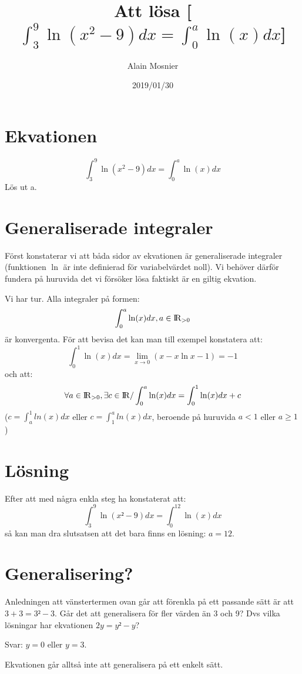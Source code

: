 \documentclass[12pt]{article}
\title{Att lösa [$\int_{3}^{9}\ln({x^2 -9})dx = \int_{0}^{a}\ln({x})dx$]}
\author{Alain Mosnier}
\date{2019/01/30}
\begin{document}
\maketitle

\section {Ekvationen}
\begin{equation}
\int_{3}^{9}\ln({x^2 -9})dx = \int_{0}^{a}\ln({x})dx
\end{equation}
Lös ut a.
\section {Generaliserade integraler}
\item Först konstaterar vi att båda sidor av ekvationen är generaliserade integraler (funktionen $\ln$ är inte definierad för variabelvärdet noll). Vi behöver därför fundera på huruvida det vi försöker lösa faktiskt är en giltig ekvation.
\item Vi har tur. Alla integraler på formen:
\begin{equation}
\int_{0}^{a}\ln({x})dx, a \in {\rm I\!R}_{>0}
\end{equation}
är konvergenta.
För att bevisa det kan man till exempel konstatera att:
\begin{equation}
\int_{0}^{1}\ln({x})dx=\lim_{x \to 0}(x-x\ln x-1)=-1
\end{equation}
och att:
\begin{equation}
\forall a \in {\rm I\!R}_{>0}, \exists c \in {\rm I\!R} / \int_{0}^{a}\ln({x})dx=\int_{0}^{1}\ln({x})dx+c
\end{equation}
($c=\int_{a}^{1}ln({x})dx$ eller $c=\int_{1}^{a}ln({x})dx$, beroende på huruvida $a<1$ eller $a\geq1$)
\section {Lösning}
Efter att med några enkla steg ha konstaterat att:
\begin{equation}
\int_{3}^{9}\ln({x²-9})dx=\int_{0}^{12}\ln({x})dx
\end{equation}
så kan man dra slutsatsen att det bara finns en lösning: $a=12$.
\section {Generalisering?}
Anledningen att vänstertermen ovan går att förenkla på ett passande sätt är att $3+3=3²-3$. Går det att generalisera för fler värden än 3 och 9? Dvs vilka lösningar har ekvationen $2y=y²-y$?
\item Svar: $y=0$ eller $y=3$.
\item Ekvationen går alltså inte att generalisera på ett enkelt sätt.
\end{document}
